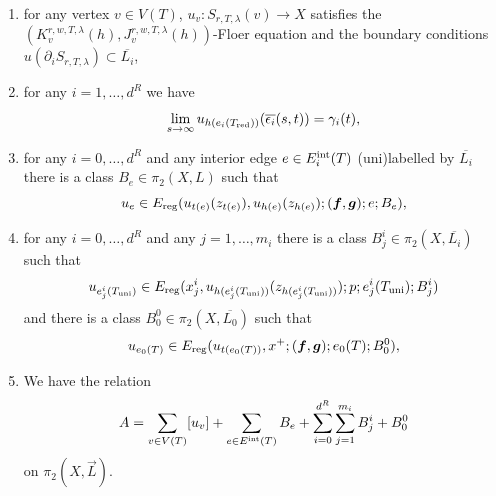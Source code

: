 	\begin{enumerate}
		\item for any vertex $v\in V(T)$, $u_v\colon S_{r,T,\lambda}(v)\to X$ satisfies the $(K^{r,w,T,\lambda}_v(h),J^{r,w,T,\lambda}_v(h))$-Floer equation and the boundary conditions $u(\partial_iS_{r,T,\lambda})\subset \overline{L_i}$,
		\item for any $i=1,\ldots,d^R$ we have $$\lim_{s\to \-\infty}u_{h(e_i(T_\textnormal{red}))}(\overline{\epsilon_i}(s,t))=\gamma_i(t),$$
		\item for any $i=0,\ldots,d^R$ and any interior edge $e\in E_i^\textnormal{int}(T)$ (uni)labelled by $\overline{L_i}$ there is a class $B_e\in \pi_2(X,L)$ such that $$u_e\in E_\textnormal{reg}(u_{t(e)}(z_{t(e)}), u_{h(e)}(z_{h(e)});(\boldsymbol{f},\boldsymbol{g});e;B_e),$$
		\item for any $i=0,\ldots,d^R$ and any $j=1,\ldots,m_i$ there is a class $B_j^i\in \pi_2(X,\overline{L_i})$ such that $$u_{e^i_j(T_\textnormal{uni})}\in E_\textnormal{reg}(x^i_{j}, u_{h(e^i_j(T_\textnormal{uni}))}(z_{h(e^i_j(T_\textnormal{uni}))});p;e^i_j(T_\textnormal{uni});B_j^i)$$ and there is a class $B_0^0\in \pi_2(X,\overline{L_0})$ such that $$u_{e_0(T)}\in E_\textnormal{reg}(u_{t(e_0(T))}, x^+;(\boldsymbol{f},\boldsymbol{g});e_0(T);B_0^0),$$
		\item We have the relation $$A=\sum_{v\in V(T)}[u_v]+\sum_{e\in E^\textnormal{int}(T)}B_e+\sum_{i=0}^{d^R}\sum_{j=1}^{m_i}B_j^i+B_0^0$$ on $\pi_2(X,\vec{L})$.
	\end{enumerate}
	
